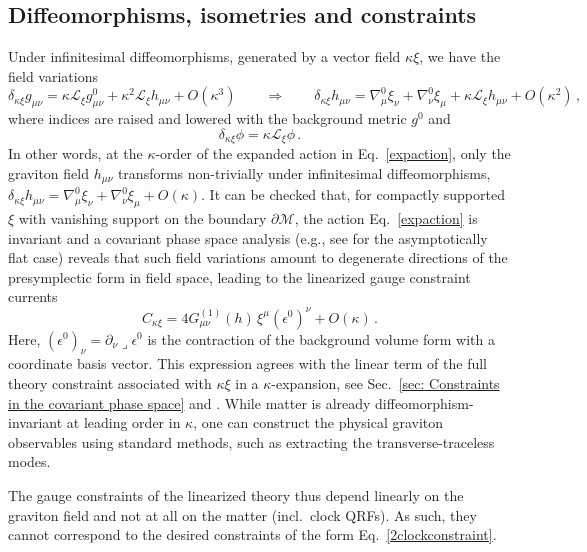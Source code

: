 \documentclass[]{jkpaper}
\theoremstyle{plain}
\theoremstyle{definition}
\newcommand{\sins}{\mathop{\lrcorner}}
\begin{document}
\subsection{Diffeomorphisms, isometries and constraints}


Under infinitesimal diffeomorphisms, generated by a vector field $\kappa\xi$, we have the field variations
\begin{equation}
    \delta_{\kappa\xi}g_{\mu \nu}=\kappa\mathcal L_\xi g^0_{\mu \nu}+\kappa^2\mathcal L_\xi h_{\mu \nu}+O(\kappa^3)\qquad \Rightarrow \qquad \delta_{\kappa\xi}h_{\mu \nu}=\nabla^0_\mu\xi_\nu+\nabla^0_\nu\xi_\mu+\kappa\mathcal L_\xi h_{\mu \nu}+O(\kappa^2)\,,\label{variation}
\end{equation}
where indices are raised and lowered with the background metric $g^0$ and
\begin{equation}\label{variation2}
\delta_{\kappa\xi}\phi=\kappa\mathcal{L}_\xi\phi\,.
\end{equation}
In other words, at the $\kappa$-order of the expanded action in Eq.~\eqref{expaction}, only the graviton field $h_{\mu \nu}$ transforms non-trivially under infinitesimal diffeomorphisms, $\delta_{\kappa\xi}h_{\mu \nu}=\nabla^0_\mu\xi_\nu+\nabla^0_\nu\xi_\mu+O(\kappa)$. It can be checked that, for compactly supported $\xi$ with vanishing support on the boundary $\partial\mathcal M$, the action Eq.~\eqref{expaction} is invariant and a covariant phase space analysis (e.g., see \cite{Hollands:2012sf,Donnelly:2016rvo} for the asymptotically flat case) reveals that such field variations amount to degenerate directions of the presymplectic form in field space, leading to the linearized gauge constraint currents
\begin{equation}\label{lincon}
    C_{\kappa\xi}=4G_{\mu \nu}^{(1)}(h)\,\xi^\mu(\epsilon^0)^\nu+O(\kappa)\,.
\end{equation}
Here, $(\epsilon^0)_\nu=\partial_\nu\sins\epsilon^0$ is the contraction of the background volume form with a coordinate basis vector. This expression agrees with the linear term of the full theory constraint associated with $\kappa\xi$ in a $\kappa$-expansion, see Sec.~\ref{sec: Constraints in the covariant phase space} and \cite{Jensen:2023yxy}. While matter is already diffeomorphism-invariant at leading order in $\kappa$, one can construct the physical graviton observables using standard methods, such as extracting the transverse-traceless modes.


The gauge constraints of the linearized theory thus depend linearly on the graviton field and not at all on the matter (incl.\ clock QRFs). As such, they cannot correspond to the desired constraints of the form Eq.~\eqref{2clockconstraint}.
\end{document}
